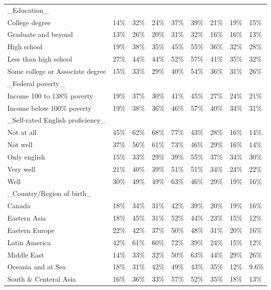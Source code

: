 \documentclass[
]{article}
\begin{document}
\begin{longtable}[t]{lllllllll}
\_Education\_ &  &  &  &  &  &  &  & \\
\addlinespace
College degree & 14\% & 32\% & 24\% & 37\% & 39\% & 21\% & 19\% & 15\%\\
Graduate and beyond & 13\% & 26\% & 20\% & 31\% & 32\% & 16\% & 16\% & 13\%\\
High school & 19\% & 38\% & 35\% & 45\% & 55\% & 36\% & 32\% & 28\%\\
Less than high school & 27\% & 44\% & 44\% & 52\% & 57\% & 41\% & 35\% & 32\%\\
Some college or Associate degree & 15\% & 33\% & 29\% & 40\% & 54\% & 36\% & 31\% & 26\%\\
\addlinespace
\_Federal poverty\_ &  &  &  &  &  &  &  & \\
Income  100 to 138\% poverty & 19\% & 37\% & 30\% & 41\% & 45\% & 27\% & 24\% & 21\%\\
Income below 100\% poverty & 19\% & 38\% & 36\% & 46\% & 57\% & 40\% & 34\% & 31\%\\
\_Self-rated English proficiency\_ &  &  &  &  &  &  &  & \\
Not at all & 45\% & 62\% & 68\% & 77\% & 43\% & 28\% & 16\% & 14\%\\
\addlinespace
Not well & 37\% & 56\% & 61\% & 73\% & 46\% & 29\% & 16\% & 14\%\\
Only english & 15\% & 33\% & 29\% & 39\% & 55\% & 37\% & 34\% & 30\%\\
Very well & 21\% & 40\% & 39\% & 51\% & 51\% & 34\% & 24\% & 22\%\\
Well & 30\% & 49\% & 49\% & 63\% & 46\% & 29\% & 19\% & 16\%\\
\_Country/Region of birth\_ &  &  &  &  &  &  &  & \\
\addlinespace
Canada & 18\% & 34\% & 31\% & 42\% & 39\% & 20\% & 19\% & 16\%\\
Eastern Asia & 18\% & 45\% & 31\% & 52\% & 44\% & 23\% & 15\% & 12\%\\
Eastern Europe & 22\% & 42\% & 37\% & 50\% & 48\% & 31\% & 20\% & 16\%\\
Latin America & 42\% & 61\% & 60\% & 72\% & 39\% & 24\% & 15\% & 12\%\\
Middle East & 14\% & 33\% & 32\% & 50\% & 63\% & 44\% & 29\% & 26\%\\
\addlinespace
Oceania and at Sea & 18\% & 31\% & 42\% & 49\% & 43\% & 35\% & 12\% & 9.6\%\\
South  \& Centeral Asia & 16\% & 36\% & 33\% & 57\% & 52\% & 35\% & 18\% & 13\%\\

\end{longtable}
\end{document}
